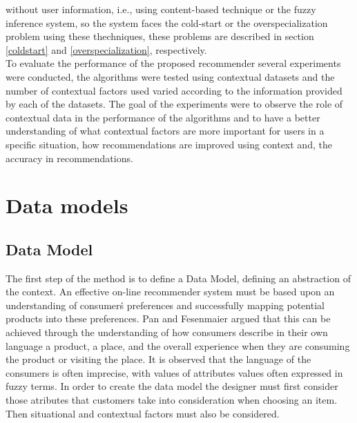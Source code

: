 without user information, i.e., using content-based technique or the
fuzzy inference system, so the system faces the cold-start or the
overspecialization problem using these thechniques, these problems are
described in section \ref{coldstart} and 
\ref{overspecialization}, respectively.\\
To evaluate the performance of the proposed recommender several experiments
were conducted, the algorithms were tested using contextual datasets and
the number of contextual factors used varied according to the information
provided by each of the datasets. The goal of the experiments were to observe
the role of contextual data  in the performance of the algorithms and to 
have a better understanding of what contextual
factors are more important for users in a specific situation, how recommendations
are improved using context and, the accuracy in recommendations.






\section{Data models} 
\subsection{Data Model}
The first step of the method is to define a Data Model, 
defining an abstraction of the context. An effective on-line 
recommender system must be based upon an
understanding of consumer\'s  preferences and successfully mapping
potential products into these
preferences\cite{adomavicius2011context}. Pan and
Fesenmaier\cite{pan2006online} argued that this can be achieved
through the understanding of how consumers describe in their own
language a product, a place, and the overall experience when they are
consuming the product or visiting the place. It is observed that 
the language of the consumers is often imprecise, with values of attributes 
values often expressed in fuzzy terms. In order to create the data model
the designer must first consider those atributes that customers
take into consideration when choosing an item. Then situational 
and contextual factors must also be considered. 


